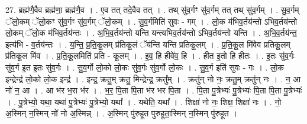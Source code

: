 \documentclass[17pt]{extarticle}
\begin{document}
27. ब्रह्म॑णै॒वैव ब्रह्म॑णा॒ ब्रह्म॑णै॒व । . ए॒व तत् तदे॒वैव तत् । . तथ् सु॑व॒र्गꣳ सु॑व॒र्गम् तत् तथ् सु॑व॒र्गम् । . सु॒व॒र्गम् ॅलो॒कम् ॅलो॒कꣳ सु॑व॒र्गꣳ सु॑व॒र्गम् ॅलो॒कम् । . सु॒व॒र्गमिति॑ सुवः - गम् । . लो॒क म॑भिव॒र्तय॑न्तो ऽभिव॒र्तय॑न्तो लो॒कम् ॅलो॒क म॑भिव॒र्तय॑न्तः । . अ॒भि॒व॒र्तय॑न्तो यन्ति यन्त्यभिव॒र्तय॑न्तो ऽभिव॒र्तय॑न्तो यन्ति । . अ॒भि॒व॒र्तय॑न्त॒ इत्य॑भि - व॒र्तय॑न्तः । . य॒न्ति॒ प्र॒ति॒कू॒लम् प्र॑तिकू॒लं ॅय॑न्ति यन्ति प्रतिकू॒लम् । . प्र॒ति॒कू॒ल मि॑वेव प्रतिकू॒लम् प्र॑तिकू॒ल मि॑व । . प्र॒ति॒कू॒लमिति॑ प्रति - कू॒लम् । . इ॒व॒ हि हीवे॑व॒ हि । . हीत इ॒तो हि हीतः । . इ॒तः सु॑व॒र्गः सु॑व॒र्ग इ॒त इ॒तः सु॑व॒र्गः । . सु॒व॒र्गो लो॒को लो॒कः सु॑व॒र्गः सु॑व॒र्गो लो॒कः । . सु॒व॒र्ग इति॑ सुवः - गः । . लो॒क इन्द्रेन्द्र॑ लो॒को लो॒क इन्द्र॑ । . इन्द्र॒ क्रतु॒म् क्रतु॒ मिन्द्रेन्द्र॒ क्रतु᳚म् । . क्रतु॑न् नो नः॒ क्रतु॒म् क्रतु॑न् नः । . न॒ आ नो॑ न॒ आ । . आ भ॑र भ॒रा भ॑र । . भ॒र॒ पि॒ता पि॒ता भ॑र भर पि॒ता । . पि॒ता पु॒त्रेभ्यः॑ पु॒त्रेभ्यः॑ पि॒ता पि॒ता पु॒त्रेभ्यः॑ । . पु॒त्रेभ्यो॒ यथा॒ यथा॑ पु॒त्रेभ्यः॑ पु॒त्रेभ्यो॒ यथा᳚ । . यथेति॒ यथा᳚ । . शिक्षा॑ नो नः॒ शिक्ष॒ शिक्षा॑ नः । . नो॒ अ॒स्मिन् न॒स्मिन् नो॑ नो अ॒स्मिन्न् । . अ॒स्मिन् पु॑रुहूत पुरुहूता॒स्मिन् न॒स्मिन् पु॑रुहूत । \newline
\end{document}
